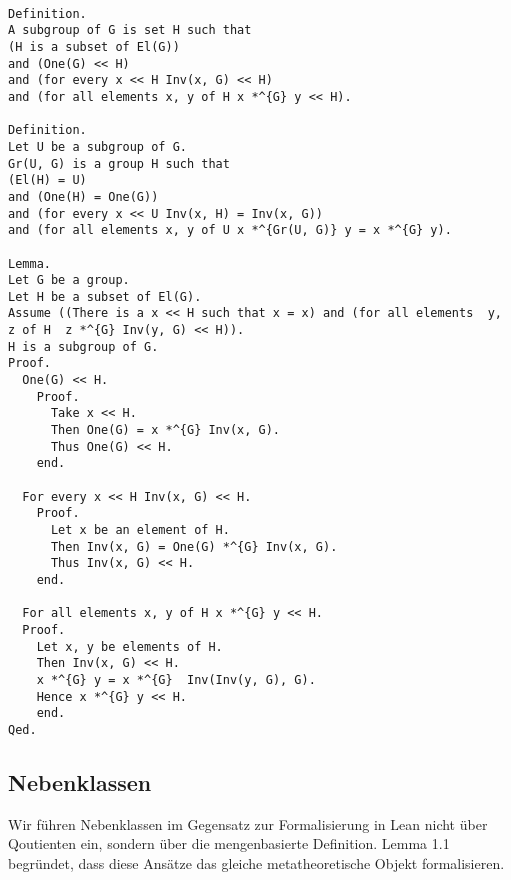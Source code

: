 \documentclass[a4paper,12pt]{scrartcl}
\begin{document}
\begin{lstlisting}

Definition.
A subgroup of G is set H such that
(H is a subset of El(G))
and (One(G) << H)
and (for every x << H Inv(x, G) << H)
and (for all elements x, y of H x *^{G} y << H).

Definition.
Let U be a subgroup of G.
Gr(U, G) is a group H such that
(El(H) = U)
and (One(H) = One(G))
and (for every x << U Inv(x, H) = Inv(x, G))
and (for all elements x, y of U x *^{Gr(U, G)} y = x *^{G} y).

Lemma.
Let G be a group.
Let H be a subset of El(G).
Assume ((There is a x << H such that x = x) and (for all elements  y, z of H  z *^{G} Inv(y, G) << H)).
H is a subgroup of G.
Proof.
  One(G) << H.
    Proof.
      Take x << H.
      Then One(G) = x *^{G} Inv(x, G).
      Thus One(G) << H.
    end.

  For every x << H Inv(x, G) << H.
    Proof.
      Let x be an element of H.
      Then Inv(x, G) = One(G) *^{G} Inv(x, G).
      Thus Inv(x, G) << H.
    end.

  For all elements x, y of H x *^{G} y << H.
  Proof.
    Let x, y be elements of H.
    Then Inv(x, G) << H.
    x *^{G} y = x *^{G}  Inv(Inv(y, G), G).
    Hence x *^{G} y << H.
    end.
Qed.

\end{lstlisting}

\subsection{Nebenklassen}

Wir führen Nebenklassen im Gegensatz zur Formalisierung in Lean nicht über Qoutienten ein, sondern über die mengenbasierte Definition.
Lemma 1.1 begründet, dass diese Ansätze das gleiche metatheoretische Objekt formalisieren.
\end{document}
